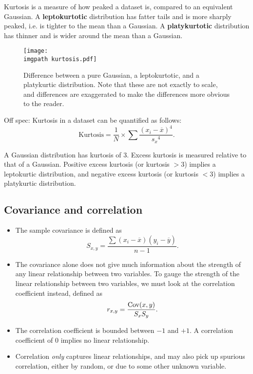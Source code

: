 \documentclass[../notes_compiled.tex]{subfiles}
\begin{document}
\begin{itemize}
\item Kurtosis is a measure of how peaked a dataset is, compared to an equivalent Gaussian. A \textbf{leptokurtotic} distribution has fatter tails and is more sharply peaked, i.e. is tighter to the mean than a Gaussian. A \textbf{platykurtotic} distribution has thinner and is wider around the mean than a Gaussian.

\begin{figure}[h]
  \centering
  \texttt{[image: \\imgpath kurtosis.pdf]}
  \caption{Difference between a pure Gaussian, a leptokurtotic, and a platykurtic distribution. Note that these are not exactly to scale, and differences are exaggerated to make the differences more obvious to the reader.}
\end{figure}

{\color{ForestGreen}
\item[] Off spec: Kurtosis in a dataset can be quantified as follows:
\begin{equation*}
\text{Kurtosis} = \frac{1}{N} \times\sum\frac{\left(x_{i}-\overline{x}\right)^{4}}{{s_{x}}^{4}}.
\end{equation*}
}

\item[] A Gaussian distribution has kurtosis of 3. Excess kurtosis is measured relative to that of a Gaussian. Positive excess kurtosis (or kurtosis $>3$) implies a leptokurtic distribution, and negative excess kurtosis (or kurtosis $<3$) implies a platykurtic distribution.

\end{itemize}

\subsection{Covariance and correlation}
\begin{itemize}
\item The sample covariance is defined as
\begin{equation}
S_{x,y} = \frac{\sum\left(x_{i}-\overline{x}\right)\left(y_{i}-\overline{y}\right)}{n-1}.
\end{equation}

\item[] The covariance alone does not give much information about the strength of any linear relationship between two variables. To gauge the strength of the linear relationship between two variables, we must look at the correlation coefficient instead, defined as
\begin{equation}
r_{x,y} = \frac{\operatorname{Cov}(x,y)}{S_{x}S_{y}}.
\end{equation}
\item The correlation coefficient is bounded between $-1$ and $+1$. A correlation coefficient of 0 implies no linear relationship.

\item Correlation \emph{only} captures linear relationships, and may also pick up spurious correlation, either by random, or due to some other unknown variable.

\end{itemize}
\end{document}
